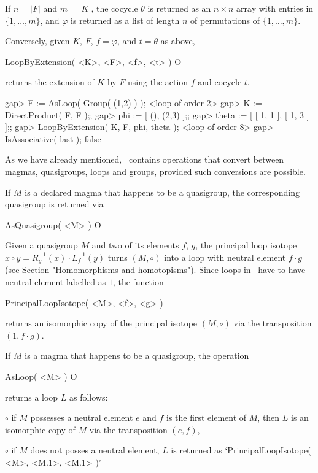 If $n=|F|$ and $m=|K|$, the cocycle $\theta$ is returned as an $n\times n$
array with entries in $\{1,\dots,m\}$, and $\varphi$ is returned as a list of
length $n$ of permutations of $\{1,\dots,m\}$.

Conversely, given $K$, $F$, $f = \varphi$, and $t = \theta$ as above,

\>LoopByExtension( <K>, <F>, <f>, <t> ) O

returns the extension of $K$ by $F$ using the action $f$ and cocycle $t$.

\beginexample
gap> F := AsLoop( Group( (1,2) ) );
<loop of order 2>
gap> K := DirectProduct( F, F );;
gap> phi := [ (), (2,3) ];;
gap> theta := [ [ 1, 1 ], [ 1, 3 ] ];;
gap> LoopByExtension( K, F, phi, theta );
<loop of order 8>
gap> IsAssociative( last );
false
\endexample


As we have already mentioned, \LOOPS\ contains operations that convert
between magmas, quasigroups, loops and groups, provided such conversions are
possible.

If $M$ is a declared magma that happens to be a quasigroup, the corresponding
quasigroup is returned via

\>AsQuasigroup( <M> ) O

Given a quasigroup $M$ and two of its elements $f$, $g$, the principal loop
isotope $x\circ y = R_g^{-1}(x)\cdot L_f^{-1}(y)$ turns $(M,\circ)$ into a loop
with neutral element $f\cdot g$ (see Section "Homomorphisms and homotopisms").
Since loops in \LOOPS\ have to have neutral element labelled as $1$, the
function

\>PrincipalLoopIsotope( <M>, <f>, <g> )

returns an isomorphic copy of the principal isotope $(M,\circ)$ via the
transposition $(1,f\cdot g)$.

If $M$ is a magma that happens to be a quasigroup, the operation

\>AsLoop( <M> ) O

returns a loop $L$ as follows:
\beginlist%
\item{$\circ$}
    if $M$ possesses a neutral element $e$ and $f$ is the first element of $M$,
    then $L$ is an isomorphic copy of $M$ via the transposition $(e,f)$,
\item{$\circ$}
    if $M$ does not posses a neutral element, $L$ is returned as
    `PrincipalLoopIsotope( <M>, <M.1>, <M.1> )'
\endlist

